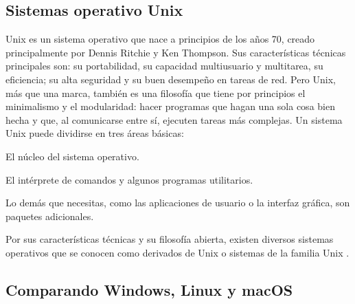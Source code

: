 \subsection{Sistemas operativo Unix}

\begin{list}{}%
    {\setlength{\leftmargin}{1cm}\setlength{\rightmargin}{1cm}}
    \item\relax
    \small

Unix es un sistema operativo que nace a principios de los años 70, creado principalmente por Dennis Ritchie y Ken Thompson. Sus características técnicas principales son: su portabilidad, su capacidad multiusuario y multitarea, su eficiencia; su alta seguridad y su buen desempeño en tareas de red. Pero Unix, más que una marca, también es una filosofía que tiene por principios el minimalismo y el modularidad: hacer programas que hagan una sola cosa bien hecha y que, al comunicarse entre sí, ejecuten tareas más complejas.
Un sistema Unix puede dividirse en tres áreas básicas: 

        El núcleo del sistema operativo.

        El intérprete de comandos y algunos programas utilitarios.

        Lo demás que necesitas, como las aplicaciones de usuario o la interfaz gráfica, son paquetes adicionales.

Por sus características técnicas y su filosofía abierta, existen diversos sistemas operativos que se conocen como derivados de Unix o sistemas de la familia Unix \cite{CitaD9}.

\end{list}


\subsection{Comparando Windows, Linux y macOS}

